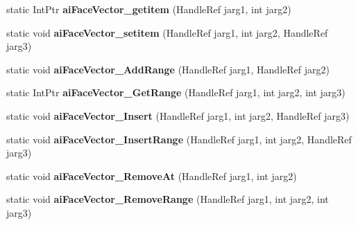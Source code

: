 \begin{DoxyCompactItemize}
\item 
\hypertarget{class_assimp_p_i_n_v_o_k_e_ae22fc5d22c7e62cc4b0cf52f468fa7a5}{static Int\+Ptr {\bfseries ai\+Face\+Vector\+\_\+getitem} (Handle\+Ref jarg1, int jarg2)}\label{class_assimp_p_i_n_v_o_k_e_ae22fc5d22c7e62cc4b0cf52f468fa7a5}

\item 
\hypertarget{class_assimp_p_i_n_v_o_k_e_a256a47651ac3fb79173e3be5c83472e1}{static void {\bfseries ai\+Face\+Vector\+\_\+setitem} (Handle\+Ref jarg1, int jarg2, Handle\+Ref jarg3)}\label{class_assimp_p_i_n_v_o_k_e_a256a47651ac3fb79173e3be5c83472e1}

\item 
\hypertarget{class_assimp_p_i_n_v_o_k_e_acf43982147c49c6b1b67a087a987c994}{static void {\bfseries ai\+Face\+Vector\+\_\+\+Add\+Range} (Handle\+Ref jarg1, Handle\+Ref jarg2)}\label{class_assimp_p_i_n_v_o_k_e_acf43982147c49c6b1b67a087a987c994}

\item 
\hypertarget{class_assimp_p_i_n_v_o_k_e_a5e6ea9e78b448ce613a075fcf822aebb}{static Int\+Ptr {\bfseries ai\+Face\+Vector\+\_\+\+Get\+Range} (Handle\+Ref jarg1, int jarg2, int jarg3)}\label{class_assimp_p_i_n_v_o_k_e_a5e6ea9e78b448ce613a075fcf822aebb}

\item 
\hypertarget{class_assimp_p_i_n_v_o_k_e_a2a27d46c537b3935704526e8f0f9e532}{static void {\bfseries ai\+Face\+Vector\+\_\+\+Insert} (Handle\+Ref jarg1, int jarg2, Handle\+Ref jarg3)}\label{class_assimp_p_i_n_v_o_k_e_a2a27d46c537b3935704526e8f0f9e532}

\item 
\hypertarget{class_assimp_p_i_n_v_o_k_e_a2cd4b27f60ffa8ee15fd6c4bca4ef9ac}{static void {\bfseries ai\+Face\+Vector\+\_\+\+Insert\+Range} (Handle\+Ref jarg1, int jarg2, Handle\+Ref jarg3)}\label{class_assimp_p_i_n_v_o_k_e_a2cd4b27f60ffa8ee15fd6c4bca4ef9ac}

\item 
\hypertarget{class_assimp_p_i_n_v_o_k_e_a99ce7dbc7ae6e4e51834f535161731f8}{static void {\bfseries ai\+Face\+Vector\+\_\+\+Remove\+At} (Handle\+Ref jarg1, int jarg2)}\label{class_assimp_p_i_n_v_o_k_e_a99ce7dbc7ae6e4e51834f535161731f8}

\item 
\hypertarget{class_assimp_p_i_n_v_o_k_e_ae19c25129f2197ff46299eeef4cf7b90}{static void {\bfseries ai\+Face\+Vector\+\_\+\+Remove\+Range} (Handle\+Ref jarg1, int jarg2, int jarg3)}\label{class_assimp_p_i_n_v_o_k_e_ae19c25129f2197ff46299eeef4cf7b90}


\end{DoxyCompactItemize}
